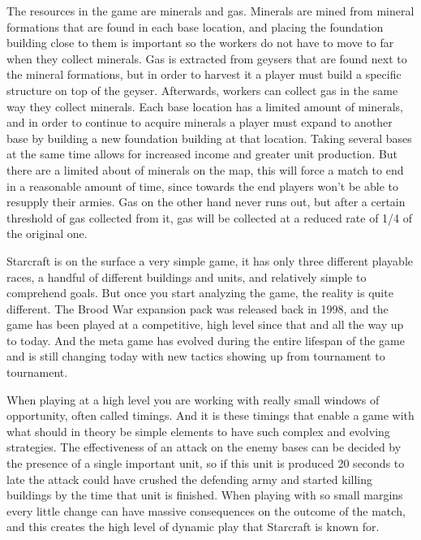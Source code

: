 The resources in the game are minerals and gas. Minerals are mined from mineral
formations that are found in each base location, and placing the foundation
building close to them is important so the workers do not have to move to far
when they collect minerals. Gas is extracted from geysers that are found next to
the mineral formations, but in order to harvest it a player must build a
specific structure on top of the geyser. Afterwards, workers can collect gas in
the same way they collect minerals. Each base location has a limited amount of
minerals, and in order to continue to acquire minerals a player must expand to
another base by building a new foundation building at that location. Taking
several bases at the same time allows for increased income and greater unit
production. But there are a limited about of minerals on the map, this will
force a match to end in a reasonable amount of time, since towards the end
players won't be able to resupply their armies. Gas on the other hand never runs
out, but after a certain threshold of gas collected from it, gas will be
collected at a reduced rate of 1/4 of the original one.

Starcraft is on the surface a very simple game, it has only three different
playable races, a handful of different buildings and units, and relatively
simple to comprehend goals. But once you start analyzing the game, the reality
is quite different. The Brood War expansion pack was released back in 1998, and
the game has been played at a competitive, high level since that and all the way
up to today. And the meta game has evolved during the entire lifespan of the
game and is still changing today with new tactics showing up from tournament to
tournament. \cite{blizzardstarcraft}

When playing at a high level you are working with really small windows of
opportunity, often called timings. And it is these timings that enable a game
with what should in theory be simple elements to have such complex and evolving
strategies. The effectiveness of an attack on the enemy bases can be decided by
the presence of a single important unit, so if this unit is produced 20 seconds
to late the attack could have crushed the defending army and started killing
buildings by the time that unit is finished. When playing with so small margins
every little change can have massive consequences on the outcome of the match,
and this creates the high level of dynamic play that Starcraft is known for.
 
